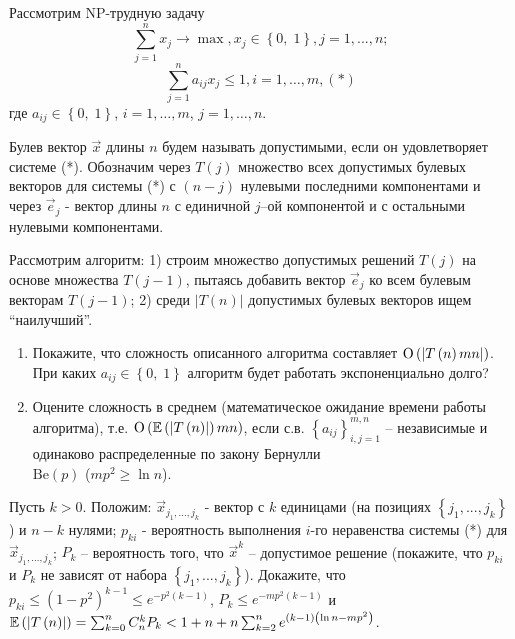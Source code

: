 \begin{problem} 

Рассмотрим  NP-трудную задачу
\[\sum _{j=1}^{n}x_{j}  \to \max , x_{j} \in \left\{0,\; 1\right\}, j=1,...,n;\] 
\[\sum _{j=1}^{n}a_{ij} x_{j}  \le 1, i=1,\ldots,m,                         (*)\] 
где $a_{ij} \in \left\{0,\; 1\right\}$, $i=1,\ldots,m$, $j=1,\ldots,n$.

Булев вектор $\vec{x}$ длины $n$ будем называть допустимыми, если он удовлетворяет системе (*). Обозначим через $T\left(j\right)$ множество всех допустимых булевых векторов для системы (*) с $(n-j)$ нулевыми последними компонентами и через $\vec{e}_{j} $ - вектор длины $n$ с единичной $j$--ой компонентой и с остальными нулевыми компонентами.

Рассмотрим алгоритм: 1) строим множество допустимых решений $T\left(j\right)$ на основе множества $T\left(j-1\right)$, пытаясь добавить вектор $\vec{e}_{j} $ ко всем булевым векторам $T\left(j-1\right)$; 2) среди $\left|T\left(n\right)\right|$ допустимых булевых векторов ищем ``наилучший''.
\begin{enumerate}
\item Покажите, что сложность описанного алгоритма составляет ${\rm O} \left(\left|T\left(n\right)mn\right|\right)$. При каких $a_{ij} \in \left\{0,\; 1\right\}$ алгоритм будет работать экспоненциально долго?

\item Оцените сложность в среднем (математическое ожидание времени работы алгоритма), т.е. ${\rm O} \left(\mathrm{{\mathbb E}}\left(\left|T\left(n\right)\right|\right)mn\right)$, если с.в. $\left\{a_{ij} \right\}_{i,j=1}^{m,n} $ -- независимые и одинаково распределенные по закону Бернулли \\ $\mathrm{Be}\left(p\right)$ ($mp^{2} \ge \ln n$).
\end{enumerate}

\begin{ordre}
Пусть $k>0$. Положим: $\vec{x}_{j_{1} ,...,j_{k} } $ - вектор с $k$ единицами (на позициях $\left\{j_{1} ,...,j_{k} \right\}$) и $n-k$ нулями; $p_{ki} $ - вероятность выполнения $i$-го неравенства системы (*) для $\vec{x}_{j_{1} ,...,j_{k} } $; $P_{k} $ -- вероятность того, что $\vec{x}^{k} $ -- допустимое решение (покажите, что $p_{ki} $ и $P_{k} $ не зависят от набора $\left\{j_{1} ,...,j_{k} \right\}$). Докажите, что $p_{ki} \le \left(1-p^{2} \right)^{k-1} \le e^{-p^{2} \left(k-1\right)} $, $P_{k} \le e^{-mp^{2} \left(k-1\right)} $ и $\mathrm{{\mathbb E}}\left(\left|T\left(n\right)\right|\right)=\sum _{k=0}^{n}C_{n}^{k}  P_{k} <1+n+n\sum _{k=2}^{n}e^{\left(k-1\right)\left(\ln n-mp^{2} \right)}  $.
\end{ordre}

\end{problem}

